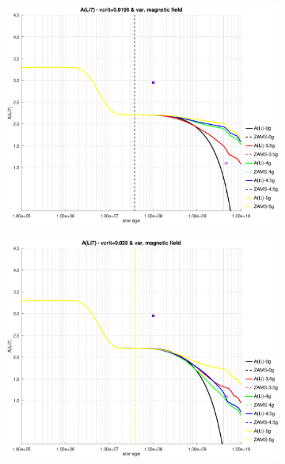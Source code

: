 \documentclass[fleqn,usenatbib]{mnras}
\begin{document}
\begin{figure}
\begin{subfigure}[h]{0.47\textwidth}
    \includegraphics[trim = 35mm 15mm 15mm 15mm, clip,width=\textwidth]{figures/li_vc_0196_var_g.eps}
    \label{fig:subim23}
    \end{subfigure}
    \begin{subfigure}[h]{0.47\textwidth}
    \includegraphics[trim = 35mm 15mm 15mm 15mm, clip,width=\textwidth]{figures/li_vc_028_var_g.eps}
    \label{fig:subim24}
    \end{subfigure}
    \begin{subfigure}[h]{0.47\textwidth}

\end{subfigure}
\end{figure}
\end{document}
